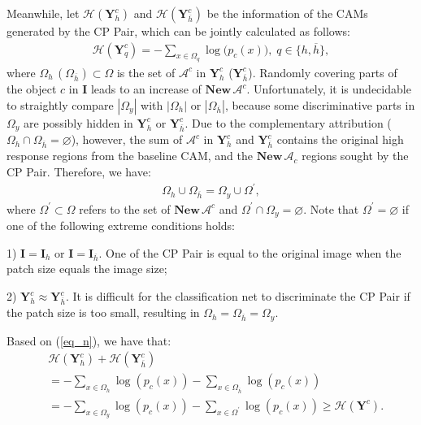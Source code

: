 \documentclass[10pt,twocolumn,letterpaper]{article}
\begin{document}
Meanwhile, let $\mathcal{H}(\boldsymbol{Y}_{h}^{c})$ and $\mathcal{H}(\boldsymbol{Y}^{c}_{\overline h})$ be the information of the CAMs generated by the CP Pair, which can be jointly calculated as follows:
\begin{align}
\mathcal{H}(\boldsymbol{Y}_{q}^{c}) =   - \sum\limits_{x \in {\Omega}_q} \log ({p_{c}(x))}, \; q \in \{h,\overline h\},\end{align}
where ${\Omega}_h \, ({\Omega}_{\overline h}) \subset {\Omega}$ is the set of $\mathcal{A}^{c}$ in $\boldsymbol{Y}_{h}^{c}$ ($\boldsymbol{Y}_{\overline h}^{c}$). Randomly covering parts of the object $c$ in $\boldsymbol{I}$ leads to an increase of $\boldsymbol{New} \, \mathcal{A}^{c}$. Unfortunately, it is undecidable to straightly compare $|{\Omega}_y|$ with $|{\Omega}_h|$ or $|{\Omega}_{\overline h}|$, because some discriminative parts in ${\Omega}_y$ are possibly hidden in $\boldsymbol{Y}^{c}_{h}$ or $\boldsymbol{Y}^{c}_{\overline h}$. Due to the complementary attribution (${\Omega}_h  \cap {\Omega}_{\overline h}=\varnothing$), however, the sum of $\mathcal{A}^{c}$ in $\boldsymbol{Y}^{c}_{h}$ and $\boldsymbol{Y}^{c}_{\overline h}$ contains the original high response regions from the baseline CAM, and the $\boldsymbol{New} \, \mathcal{A}_{c}$ regions sought by the CP Pair. Therefore, we have:
 \begin{align}
 {\Omega}_h  \cup {\Omega}_{\overline h} = {\Omega}_y \cup {\Omega}^{\prime},
 \label{eq_n}
\end{align}
where ${\Omega}^{\prime} \subset {\Omega}$ refers to the set of $\boldsymbol{New}  \, \mathcal{A}^c$ and $ {\Omega}^{\prime} \cap {\Omega}_{y} = \varnothing$. Note that ${\Omega}^{\prime} = \varnothing$ if one of the following extreme conditions holds:

1) $\boldsymbol{I}=\boldsymbol{I}_{h}$ or $\boldsymbol{I}=\boldsymbol{I}_{\overline h}$. One of the CP Pair is equal to the original image when the patch size equals the image size;

2) $\boldsymbol{Y}^{c}_{h} \approx \boldsymbol{Y}^{c}_{\overline h} $. It is difficult for the classification net to discriminate the CP Pair if the patch size is too small, resulting in ${\Omega}_h = {\Omega}_{\overline h} = {\Omega}_{y}$.

Based on (\ref{eq_n}), we have that:
\begin{equation}
\begin{aligned}
&\mathcal{H}(\boldsymbol{Y}^{c}_{h})+ \mathcal{H}(\boldsymbol{Y}^{c}_{\overline h}) \\
&= - \sum\limits_{x \in {\Omega}_h} \log ({p_{c}(x)}) - \sum\limits_{x \in {\Omega}_{\overline h}}\log ({p_{c}(x)})\\
&= - \sum\limits_{x \in {\Omega}_y} \log ({p_{c}(x)}) - \sum\limits_{x \in {\Omega}^{\prime}}\log ({p_{c}(x)})
\geq \mathcal{H}(\boldsymbol{Y}^{c}).
\end{aligned}
\label{eg_H}
\end{equation}
\end{document}
